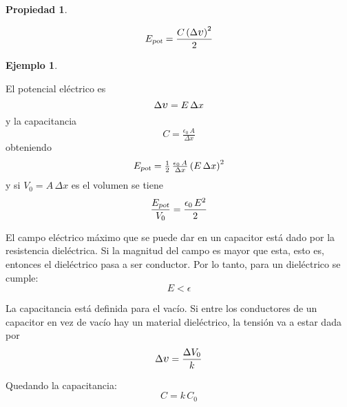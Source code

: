 \documentclass[a5paper,12pt,twoside]{book}
\newtheorem{prop}{{Propiedad}}[chapter]
\newtheorem{example}{{Ejemplo}}[chapter]
\begin{document}
\begin{mdframed}[style=MyFrame1]
    \begin{prop}
    \end{prop}
    \begin{equation*}
        \sub{E}{pot} = \frac{C \bb{\Delta \voltage}^2}{2}
    \end{equation*}
\end{mdframed}

\begin{mdframed}[style=MyFrame2]
    \begin{example}
    \end{example}

    El potencial eléctrico es
    \begin{equation*}
        \Delta \voltage = E \, \Delta x
    \end{equation*}
    y la capacitancia
    \begin{equation*}
        C = \tfrac{\epsilon_0 \, A}{\Delta x}
    \end{equation*}
    obteniendo
    \begin{equation*}
        {{E}_\textsl{{pot}}} = \tfrac{1}{2} \, \tfrac{\epsilon_0 \, A}{\Delta x} \left(E \, \Delta x\right)^2
    \end{equation*}
    y si $V_0 = A \, \Delta x$ es el volumen se tiene
    \begin{equation*}
        \frac{{{E}_\textsl{{pot}}}}{V_0} = \frac{\epsilon_0 \, E^2}{2}
    \end{equation*}
\end{mdframed}

El campo eléctrico máximo que se puede dar en un capacitor está dado por la resistencia dieléctrica. Si la magnitud del campo es mayor que esta, esto es, entonces el dieléctrico pasa a ser conductor. Por lo tanto, para un dieléctrico se cumple:
\begin{equation*}
    E < \epsilon
\end{equation*}

La capacitancia está definida para el vacío. Si entre los conductores de un capacitor en vez de vacío hay un material dieléctrico, la tensión va a estar dada por
\begin{equation*}
    \Delta \voltage = \frac{\Delta V_0}{k}
\end{equation*}

Quedando la capacitancia:
\begin{equation*}
    C = k \, C_0
\end{equation*}
\end{document}
